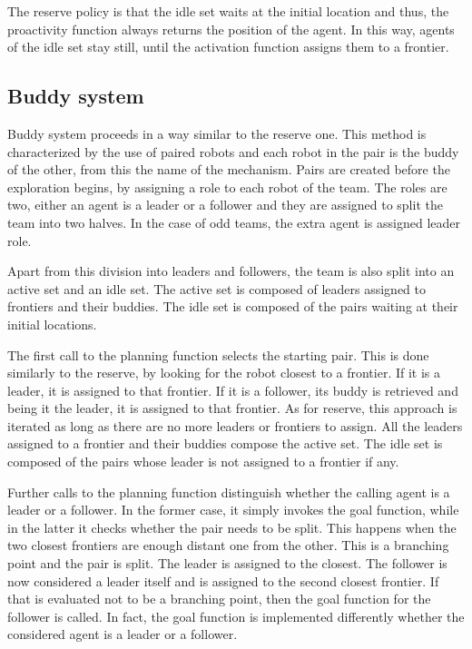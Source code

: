 The reserve policy is that the idle set waits at the initial location
and thus, the proactivity function always returns the position of
the agent. In this way, agents of the idle set stay still, until the
activation function assigns them to a frontier. 

\subsection{Buddy system}

Buddy system proceeds in a way similar to the reserve one. This method
is characterized by the use of paired robots and each robot in the
pair is the buddy of the other, from this the name of the mechanism.
Pairs are created before the exploration begins, by assigning a role
to each robot of the team. The roles are two, either an agent is a
leader or a follower and they are assigned to split the team into
two halves. In the case of odd teams, the extra agent is assigned
leader role.

Apart from this division into leaders and followers, the team is also
split into an active set and an idle set. The active set is composed
of leaders assigned to frontiers and their buddies. The idle set is
composed of the pairs waiting at their initial locations.

The first call to the planning function selects the starting pair.
This is done similarly to the reserve, by looking for the robot closest
to a frontier. If it is a leader, it is assigned to that frontier.
If it is a follower, its buddy is retrieved and being it the leader,
it is assigned to that frontier. As for reserve, this approach is
iterated as long as there are no more leaders or frontiers to assign.
All the leaders assigned to a frontier and their buddies compose the
active set. The idle set is composed of the pairs whose leader is
not assigned to a frontier if any.

Further calls to the planning function distinguish whether the calling
agent is a leader or a follower. In the former case, it simply invokes
the goal function, while in the latter it checks whether the pair
needs to be split. This happens when the two closest frontiers are
enough distant one from the other. This is a branching point and the
pair is split. The leader is assigned to the closest. The follower
is now considered a leader itself and is assigned to the second closest
frontier. If that is evaluated not to be a branching point, then the
goal function for the follower is called. In fact, the goal function
is implemented differently whether the considered agent is a leader
or a follower. 

